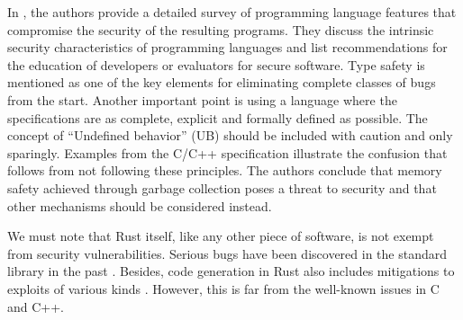 \documentclass[../Thesis.tex]{subfiles}
\begin{document}
In \cite{jaeger2014mind}, the authors provide a detailed survey of programming language features that
compromise the security of the resulting programs.
They discuss the intrinsic security characteristics of programming languages and list recommendations
for the education of developers or evaluators for secure software.
Type safety is mentioned as one of the key elements for eliminating complete classes of bugs from the start.
Another important point is using a language where the specifications are
as complete, explicit and formally defined as possible.
The concept of ``Undefined behavior'' (UB) should be included with caution and only sparingly.
Examples from the C/C++ specification illustrate the confusion that follows from not following these principles.
The authors conclude that memory safety achieved through garbage collection poses a threat to security
and that other mechanisms should be considered instead.

We must note that Rust itself, like any other piece of software, is not exempt from security vulnerabilities.
Serious bugs have been discovered in the standard library in the past \cite{davidoff2018}.
Besides, code generation in Rust also includes mitigations to exploits of various kinds \cite[Chap. 11]{rustc-book}.
However, this is far from the well-known issues in C and C++.
\end{document}
